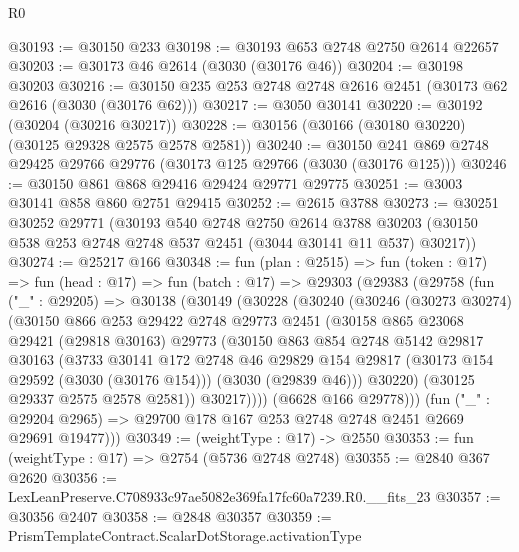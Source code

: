 \begin{lexlean}{R0}
\begin{coremodule}
@30193 := @30150 @233
@30198 := @30193 @653 @2748 @2750 @2614 @22657
@30203 := @30173 @46 @2614 (@3030 (@30176 @46))
@30204 := @30198 @30203
@30216 := @30150 @235 @253 @2748 @2748 @2616 @2451 (@30173 @62 @2616 (@3030 (@30176 @62)))
@30217 := @3050 @30141
@30220 := @30192 (@30204 (@30216 @30217))
@30228 := @30156 (@30166 (@30180 @30220) (@30125 @29328 @2575 @2578 @2581))
@30240 := @30150 @241 @869 @2748 @29425 @29766 @29776 (@30173 @125 @29766 (@3030 (@30176 @125)))
@30246 := @30150 @861 @868 @29416 @29424 @29771 @29775
@30251 := @3003 @30141 @858 @860 @2751 @29415
@30252 := @2615 @3788
@30273 := @30251
    @30252
    @29771
    (@30193
      @540
      @2748
      @2750
      @2614
      @3788
      @30203
      (@30150 @538 @253 @2748 @2748 @537 @2451 (@3044 @30141 @11 @537) @30217))
@30274 := @25217 @166
@30348 := fun (plan : @2515) =>
  fun (token : @17) =>
  fun (head : @17) =>
  fun (batch : @17) =>
  @29303
    (@29383
      (@29758
        (fun ("_" : @29205) =>
        @30138
          (@30149
            (@30228
              (@30240
                (@30246
                  (@30273 @30274)
                  (@30150
                    @866
                    @253
                    @29422
                    @2748
                    @29773
                    @2451
                    (@30158
                      @865
                      @23068
                      @29421
                      (@29818 @30163)
                      @29773
                      (@30150
                        @863
                        @854
                        @2748
                        @5142
                        @29817
                        @30163
                        (@3733
                          @30141
                          @172
                          @2748
                          @46
                          @29829
                          @154
                          @29817
                          (@30173 @154 @29592 (@3030 (@30176 @154)))
                          (@3030 (@29839 @46)))
                        @30220)
                      (@30125 @29337 @2575 @2578 @2581))
                    @30217))))
            (@6628 @166 @29778)))
        (fun ("_" : @29204 @2965) => @29700 @178 @167 @253 @2748 @2748 @2451 @2669 @29691 @19477)))
@30349 := (weightType : @17) -> @2550
@30353 := fun (weightType : @17) => @2754 (@5736 @2748 @2748)
@30355 := @2840 @367 @2620
@30356 := LexLeanPreserve.C708933c97ae5082e369fa17fc60a7239.R0.__fits_23
@30357 := @30356 @2407
@30358 := @2848 @30357
@30359 := PrismTemplateContract.ScalarDotStorage.activationType

\end{coremodule}
\end{lexlean}
